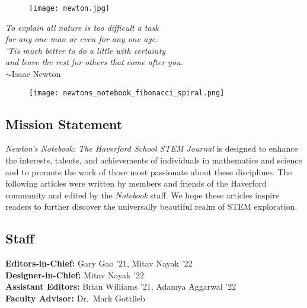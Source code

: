 \documentclass[12pt]{article}
\theoremstyle{definition}
\begin{document}
\setcounter{tocdepth}{1}



\begin{figure}[H]
    \centering \texttt{[image: newton.jpg]}
\end{figure}

\begin{center}
    \textit{To explain all nature is too difficult a task\\
    for any one man or even for any one age.\\
    'Tis much better to do a little with certainty\\
    and leave the rest for others that come after you.}\\
    	$\sim$Isaac Newton
\end{center}

\newpage
\begin{spacing}{1}
\tableofcontents
\end{spacing}

\begin{figure}[H]
    \centering
    \vspace*{75pt}
    \texttt{[image: newtons\_notebook\_fibonacci\_spiral.png]}
\end{figure}

\newpage
\subsection*{Mission Statement}
\textit{Newton’s Notebook: The Haverford School STEM Journal} is designed to enhance the interests, talents, and achievements of individuals in mathematics and science and to promote the work of those most passionate about these disciplines. The following articles were written by members and friends of the Haverford community and edited by the \textit{Notebook} staff. We hope these articles inspire readers to further discover the universally beautiful realm of STEM exploration. 
\subsection*{Staff}
{\centering{}
    \textbf{Editors-in-Chief:} Gary Gao '21, Mitav Nayak '22
    \\
    \textbf{Designer-in-Chief:} Mitav Nayak '22
    \\ 
    \textbf{Assistant Editors:} Brian Williams '21, Adamya Aggarwal '22
    \\
    \textbf{Faculty Advisor:} Dr.\ Mark Gottlieb
    \\}
\end{document}
